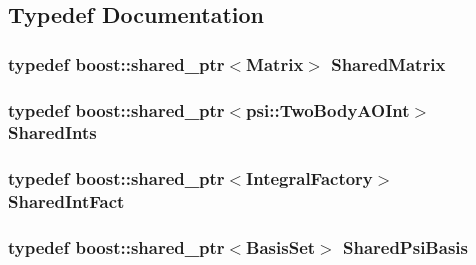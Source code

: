 \subsection{Typedef Documentation}
\hypertarget{namespacepsi_a672173d36fd5e5d06c17ff19c3bacb9d}{
\subsubsection[{SharedMatrix}]{\setlength{\rightskip}{0pt plus 5cm}typedef boost::shared\_\-ptr$<$Matrix$>$ {\bf SharedMatrix}}}
\label{namespacepsi_a672173d36fd5e5d06c17ff19c3bacb9d}
\hypertarget{namespacepsi_a7b2115040860b8011075023be6fbeb9a}{
\subsubsection[{SharedInts}]{\setlength{\rightskip}{0pt plus 5cm}typedef boost::shared\_\-ptr$<$psi::TwoBodyAOInt$>$ {\bf SharedInts}}}
\label{namespacepsi_a7b2115040860b8011075023be6fbeb9a}
\hypertarget{namespacepsi_a3b03bcb6d101bc7caa7ea1a26b9e1f50}{
\subsubsection[{SharedIntFact}]{\setlength{\rightskip}{0pt plus 5cm}typedef boost::shared\_\-ptr$<$IntegralFactory$>$ {\bf SharedIntFact}}}
\label{namespacepsi_a3b03bcb6d101bc7caa7ea1a26b9e1f50}
\hypertarget{namespacepsi_a00b3104f9d454b5adfe2d16e5f8d1e14}{
\subsubsection[{SharedPsiBasis}]{\setlength{\rightskip}{0pt plus 5cm}typedef boost::shared\_\-ptr$<$BasisSet$>$ {\bf SharedPsiBasis}}}
\label{namespacepsi_a00b3104f9d454b5adfe2d16e5f8d1e14}

